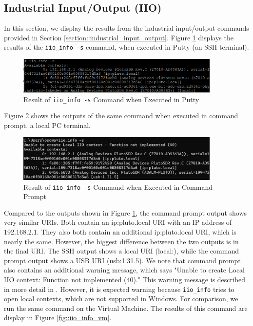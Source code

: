 \documentclass{article}
\begin{document}
\subsection{Industrial Input/Output (IIO)}

In this section, we display the results from the industrial input/output commands provided in Section \ref{section::industrial_input_output}. Figure \ref{fig::iio_info_putty} displays the results of the \texttt{iio\_info -s} command, when executed in Putty (an SSH terminal).  

\begin{figure}[H]
	\centerline{\includegraphics[width=0.9\textwidth]{iio_info_putty.png}}
	\caption{Result of \texttt{iio\_info -s} Command when Executed in Putty}
	\label{fig::iio_info_putty}
\end{figure}

Figure \ref{fig::iio_info_cmd} shows the outputs of the same command when executed in command prompt, a local PC terminal.

\begin{figure}[H]
	\centerline{\includegraphics[width=0.9\textwidth]{iio_info_cmd.png}}
	\caption{Result of \texttt{iio\_info -s} Command when Executed in Command Prompt}
	\label{fig::iio_info_cmd}
\end{figure}

Compared to the outputs shown in Figure \ref{fig::iio_info_putty}, the command prompt output shows very similar URIs. Both contain an ip:pluto.local URI with an IP address of 192.168.2.1. They also both contain an additional ip:pluto.local URI, which is nearly the same. However, the biggest difference between the two outputs is in the final URI. The SSH output shows a local URI (local:), while the command prompt output shows a USB URI (usb:1.31.5). We note that command prompt also contains an additional warning message, which says "Unable to create Local IIO context: Function not implemented (40)." This warning message is described in more detail in \cite{analog_devices_libiio_error}. However, it is expected warning because \texttt{iio\_info} tries to open local contexts, which are not supported in Windows. For comparison, we run the same command on the Virtual Machine. The results of this command are display in Figure \ref{fig::iio_info_vm}.
\end{document}
